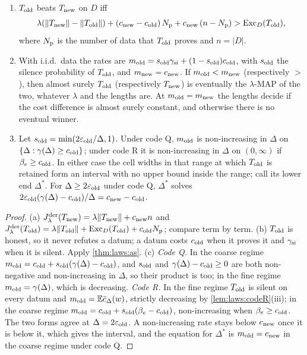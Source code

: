 \begin{proposition}\label{prop:laws:retention}
\leavevmode
\begin{enumerate}[label=(\alph*),itemsep=1pt,topsep=2pt]
\item $T_{\rm old}$ beats $T_{\rm new}$ on $D$ iff
\[\lambda(\lVert T_{\rm new}\rVert-\lVert T_{\rm old}\rVert)+(c_{\rm new}-c_{\rm old})\,N_{\rm p}+c_{\rm new}\,(n-N_{\rm p})>\mathrm{Exc}_D(T_{\rm old}),\]
where $N_{\rm p}$ is the number of data that $T_{\rm old}$ proves and $n=\lvert D\rvert$.
\item With i.i.d.\ data the rates are $m_{\rm old}=s_{\rm old}\gamma_{\rm si}+(1-s_{\rm old})c_{\rm old}$, with $s_{\rm old}$ the silence probability of $T_{\rm old}$, and $m_{\rm new}=c_{\rm new}$. If $m_{\rm old}<m_{\rm new}$ (respectively $>$), then almost surely $T_{\rm old}$ (respectively $T_{\rm new}$) is eventually the $\lambda$-MAP of the two, whatever $\lambda$ and the lengths are. At $m_{\rm old}=m_{\rm new}$ the lengths decide if the cost difference is almost surely constant, and otherwise there is no eventual winner.
\item Let $s_{\rm old}=\min(2\varepsilon_{\rm old}/\Delta,1)$. Under code Q, $m_{\rm old}$ is non-increasing in $\Delta$ on $\{\Delta:\gamma(\Delta)\ge c_{\rm old}\}$; under code R it is non-increasing in $\Delta$ on $(0,\infty)$ if $\beta_e\ge c_{\rm old}$. In either case the cell widths in that range at which $T_{\rm old}$ is retained form an interval with no upper bound inside the range; call its lower end $\Delta^*$. For $\Delta\ge2\varepsilon_{\rm old}$ under code Q, $\Delta^*$ solves $2\varepsilon_{\rm old}(\gamma(\Delta)-c_{\rm old})/\Delta=c_{\rm new}-c_{\rm old}$.
\end{enumerate}
\end{proposition}

\begin{proof}
(a) $J^{\rm der}_\lambda(T_{\rm new})=\lambda\lVert T_{\rm new}\rVert+c_{\rm new}n$ and $J^{\rm der}_\lambda(T_{\rm old})=\lambda\lVert T_{\rm old}\rVert+\mathrm{Exc}_D(T_{\rm old})+c_{\rm old}N_{\rm p}$; compare term by term. (b) $T_{\rm old}$ is honest, so it never refutes a datum; a datum costs $c_{\rm old}$ when it proves it and $\gamma_{\rm si}$ when it is silent. Apply \cref{thm:laws:as}. (c) \emph{Code Q.} In the coarse regime $m_{\rm old}=c_{\rm old}+s_{\rm old}(\gamma(\Delta)-c_{\rm old})$, and $s_{\rm old}$ and $\gamma(\Delta)-c_{\rm old}\ge0$ are both non-negative and non-increasing in $\Delta$, so their product is too; in the fine regime $m_{\rm old}=\gamma(\Delta)$, which is decreasing. \emph{Code R.} In the fine regime $T_{\rm old}$ is silent on every datum and $m_{\rm old}=\mathbb{E}\bar c_\Delta(w)$, strictly decreasing by \cref{lem:laws:codeR}(iii); in the coarse regime $m_{\rm old}=c_{\rm old}+s_{\rm old}(\beta_e-c_{\rm old})$, non-increasing when $\beta_e\ge c_{\rm old}$. The two forms agree at $\Delta=2\varepsilon_{\rm old}$. A non-increasing rate stays below $c_{\rm new}$ once it is below it, which gives the interval, and the equation for $\Delta^*$ is $m_{\rm old}=c_{\rm new}$ in the coarse regime under code Q.
\end{proof}


